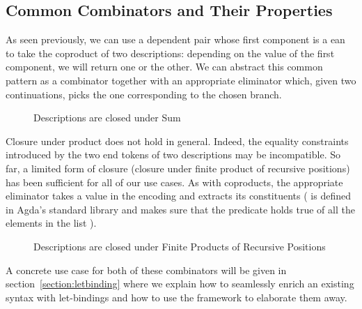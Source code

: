\subsection{Common Combinators and Their Properties}\label{desccomb}

As seen previously, we can use a dependent pair whose first component
is a ean to take the coproduct of two descriptions: depending
on the value of the first component, we will return one or the other.
We can abstract this common pattern as a combinator  together
with an appropriate eliminator  which, given two continuations,
picks the one corresponding to the chosen branch.

\begin{figure}[h]
\begin{minipage}{0.45\textwidth}
\end{minipage}\hspace{2em}
\begin{minipage}{0.45\textwidth}
\end{minipage}
\caption{Descriptions are closed under Sum}\label{figure:descsum}
\end{figure}

Closure under product does not hold in general. Indeed, the
equality constraints introduced by the two end tokens of two
descriptions may be incompatible. So far, a limited form of
closure (closure under finite product of recursive positions)
has been sufficient for all of our use cases. As with coproducts,
the appropriate eliminator  takes a value in the encoding
and extracts its constituents ({  } is defined
in Agda's standard library and makes sure that the predicate 
holds true of all the elements in the list ).

\begin{figure}[h]
\begin{minipage}{0.45\textwidth}
\end{minipage}\hspace{2em}
\begin{minipage}{0.45\textwidth}
\end{minipage}
\caption{Descriptions are closed under Finite Products of Recursive Positions}
\end{figure}

A concrete use case for both of these combinators will be given in section~\ref{section:letbinding}
where we explain how to seamlessly enrich an existing syntax with let-bindings
and how to use the  framework to elaborate them away.


